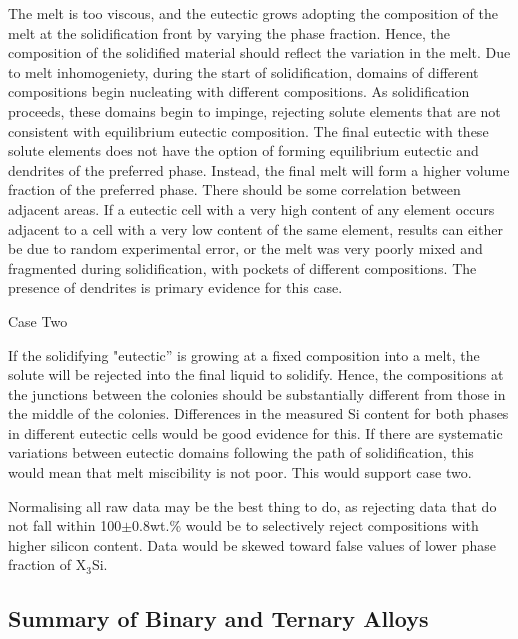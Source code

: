 The melt is too viscous, and the eutectic grows adopting the composition of the melt at the solidification front by varying the phase fraction.  Hence, the composition of the solidified material should reflect the variation in the melt.  Due to melt inhomogeniety, during the start of solidification, domains of different compositions begin nucleating with different compositions.  As solidification proceeds, these domains begin to impinge, rejecting solute elements that are not consistent with equilibrium eutectic composition. The final eutectic with these solute elements does not have the option of forming equilibrium eutectic and dendrites of the preferred phase.  Instead, the final melt will form a higher volume fraction of the preferred phase.  There should be some correlation between adjacent areas.  If a eutectic cell with a very high content of any element occurs adjacent to a cell with a very low content of the same element, results can either be due to random experimental error, or the melt was very poorly mixed and fragmented during solidification, with pockets of different compositions.  The presence of dendrites is primary evidence for this case.


Case Two

If the solidifying "eutectic” is growing at a fixed composition into a melt, the solute will be rejected into the final liquid to solidify.  Hence, the compositions at the junctions between the colonies should be substantially different from those in the middle of the colonies.
Differences in the measured Si content for both phases in different eutectic cells would be good evidence for this.  If there are systematic variations between eutectic domains following the path of solidification, this would mean that melt miscibility is not poor. This would support case two.

Normalising all raw data may be the best thing to do, as rejecting data that do not fall within 100$\pm$0.8wt.\% would be to selectively reject compositions with higher silicon content.  Data would be skewed toward false values of lower phase fraction of X$_3$Si. 


\subsection{Summary of Binary and Ternary Alloys}

